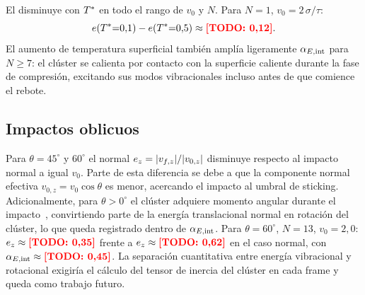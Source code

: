 El \COR{} disminuye con $T^{*}$ en todo el rango de $v_0$ y $N$. Para
$N=1$, $v_0 = 2\,\sigma/\tau$:
\begin{equation}
    e(T^{*}{=}0{,}1) - e(T^{*}{=}0{,}5) \approx \textcolor{red}{\textbf{[TODO: 0{,}12]}}.
\end{equation}
El aumento de temperatura superficial también amplía ligeramente $\alpha_{E,\mathrm{int}}$
para $N \geq 7$: el clúster se calienta por contacto con la superficie
caliente durante la fase de compresión, excitando sus modos vibracionales
incluso antes de que comience el rebote.

\subsection{Impactos oblicuos}
\label{sec:oblicuos}

Para $\theta = 45^\circ$ y $60^\circ$ el \COR{} normal
$e_z = |v_{f,z}|/|v_{0,z}|$ disminuye respecto al impacto normal a igual
$v_0$. Parte de esta diferencia se debe a que la componente normal efectiva
$v_{0,z} = v_0\cos\theta$ es menor, acercando el impacto al umbral de sticking.
Adicionalmente, para $\theta > 0^\circ$ el clúster adquiere momento angular
durante el impacto~\cite{awasthi2010}, convirtiendo parte de la energía
translacional normal en rotación del clúster, lo que queda registrado dentro
de $\alpha_{E,\mathrm{int}}$. Para $\theta = 60^\circ$, $N=13$, $v_0 = 2{,}0$:
$e_z \approx \textcolor{red}{\textbf{[TODO: 0{,}35]}}$ frente a $e_z \approx \textcolor{red}{\textbf{[TODO: 0{,}62]}}$ en el caso
normal, con $\alpha_{E,\mathrm{int}} \approx \textcolor{red}{\textbf{[TODO: 0{,}45]}}$. La separación cuantitativa
entre energía vibracional y rotacional exigiría el cálculo del tensor de
inercia del clúster en cada frame y queda como trabajo futuro.

